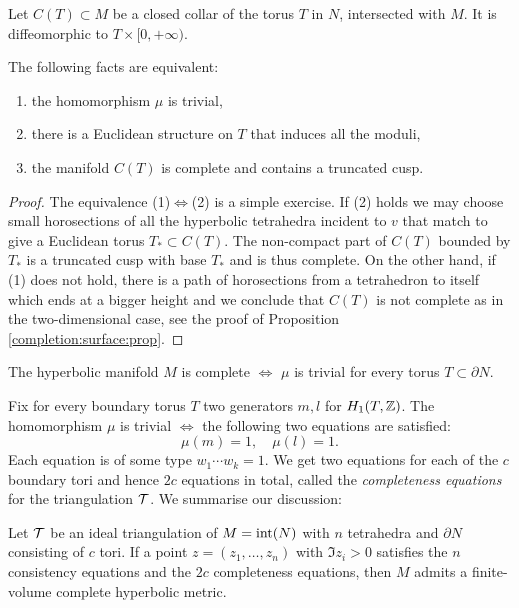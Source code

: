 Let $C(T)\subset M$ be a closed collar of the torus $T$ in $N$, intersected with $M$. It is diffeomorphic to $T\times [0,+\infty)$.

\begin{prop} \label{mu:equivalent:prop}
The following facts are equivalent:
\begin{enumerate}
\item the homomorphism $\mu$ is trivial,
\item there is a Euclidean structure on $T$ that induces all the moduli,
\item the manifold $C(T)$ is complete and contains a truncated cusp.
\end{enumerate}
\end{prop}
\begin{proof}
The equivalence (1)$\Leftrightarrow$(2) is a simple exercise.
If (2) holds we may choose small horosections of all the hyperbolic tetrahedra incident to $v$ that match to give a Euclidean torus $T_*\subset C(T)$. The non-compact part of $C(T)$ bounded by $T_*$ is a truncated cusp with base $T_*$ and is thus complete.
On the other hand, if (1) does not hold, there is a path of horosections from a tetrahedron to itself which ends at a bigger height and we conclude that $C(T)$ is not complete as in the two-dimensional case, see the proof of Proposition \ref{completion:surface:prop}.
\end{proof}

\begin{cor} The hyperbolic manifold $M$ is complete $\Longleftrightarrow$ $\mu$ is trivial for every torus $T\subset \partial N$.
\end{cor}

Fix for every boundary torus $T$ two generators $m,l$ for $H_1(T, \mathbb{Z})$. The homomorphism $\mu$ is trivial $\Longleftrightarrow$ the following two equations are satisfied:
$$\mu(m) = 1, \quad \mu(l)=1.$$ 
Each equation is of some type $w_1\cdots w_k = 1$.
We get two equations for each of the $c$ boundary tori and hence $2c$ equations in total, called the \emph{completeness equations} for the triangulation $\mathcal{T}$. We summarise our discussion:

\begin{prop}
Let $\mathcal{T}$ be an ideal triangulation of $M={\rm int}(N)$ with $n$ tetrahedra and $\partial N$ consisting of $c$ tori. If a point $z = (z_1,\ldots, z_n)$ with $\Im z_i >0$ satisfies the $n$ consistency equations and the $2c$ completeness equations, then $M$ admits a finite-volume complete hyperbolic metric.
\end{prop}


